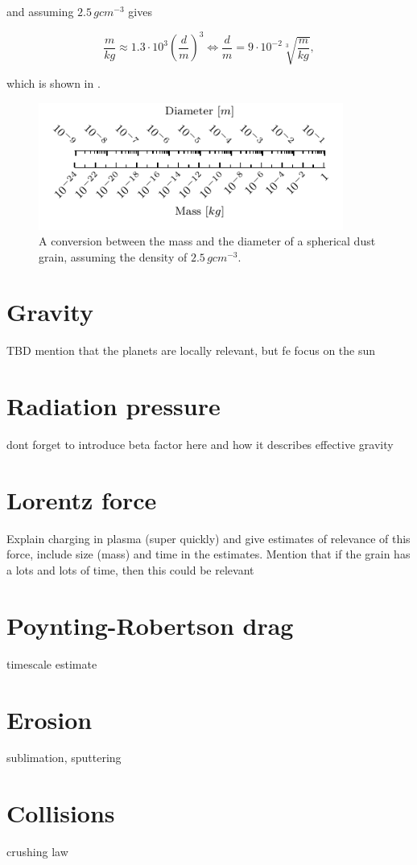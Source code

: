 and assuming $2.5 \, \si{g cm^{-3}}$ gives

\begin{equation}
    \frac{m}{\si{kg}} \approx 1.3 \cdot 10^3 \left(\frac{d}{\si{m}}\right)^3 
\Leftrightarrow 
    \frac{d}{\si{m}} = 9 \cdot 10^{-2} \sqrt[3]{\frac{m}{\si{kg}}},
\end{equation}

which is shown in .

\begin{figure}[h]
 	\centering
 	\includegraphics[width=10cm]{figures/mass_size_ruler.pdf}
 	\caption{A conversion between the mass and the diameter of a spherical dust grain, assuming the density of $2.5 \, \si{g cm^{-3}}$.}
 	\label{fig:mass_size_ruler}
\end{figure}

\section{Gravity}

TBD mention that the planets are locally relevant, but fe focus on the sun

\section{Radiation pressure}

dont forget to introduce beta factor here and how it describes effective gravity

\section{Lorentz force}

Explain charging in plasma (super quickly) and give estimates of relevance of this force, include size (mass) and time in the estimates. Mention that if the grain has a lots and lots of time, then this could be relevant

\section{Poynting-Robertson drag}

timescale estimate 

\section{Erosion}

sublimation, sputtering

\section{Collisions}

crushing law